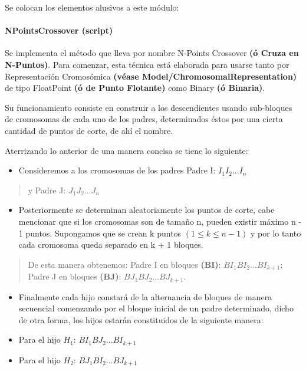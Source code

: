 \documentclass[letterpaper,10pt,english]{sphinxmanual}
\begin{document}
Se colocan los elementos alusivos a este módulo:


\paragraph{NPointsCrossover (script)}
\label{Model/Operator/Crossover/NPointsCrossover:npointscrossover-script}\label{Model/Operator/Crossover/NPointsCrossover::doc}
\begin{DUlineblock}{0em}
\item[] Se implementa el método que lleva por nombre N-Points Crossover \textbf{(ó Cruza en N-Puntos)}.
Para comenzar, esta técnica está elaborada para usarse tanto por Representación Cromosómica
\textbf{(véase Model/ChromosomalRepresentation)} de tipo FloatPoint \textbf{(ó de Punto Flotante)} como
Binary \textbf{(ó Binaria)}.
\item[] Su funcionamiento consiste en construir a los descendientes usando sub-bloques de cromosomas de cada
uno de los padres, determinados éstos por una cierta cantidad de puntos de corte, de ahí el nombre.
\item[] Aterrizando lo anterior de una manera concisa se tiene lo siguiente:
\end{DUlineblock}
\begin{itemize}
\item {} 
Consideremos a los cromosomas de los padres Padre I: \(I_1I_2...I_n\)

\end{itemize}
\begin{quote}

y Padre J: \(J_1J_2...J_n\)
\end{quote}
\begin{itemize}
\item {} 
Posteriormente se determinan aleatoriamente los puntos de corte, cabe mencionar que si los cromosomas son de tamaño n, pueden existir máximo n - 1 puntos. Supongamos que se crean k puntos \((1 \leqslant k \leqslant n - 1)\) y por lo tanto cada cromosoma queda separado en k + 1 bloques.

\end{itemize}
\begin{quote}

De esta manera obtenemos:
Padre I en bloques \textbf{(BI)}: \(BI_1BI_2...BI_{k + 1}\);
Padre J en bloques \textbf{(BJ)}: \(BJ_1BJ_2...BJ_{k + 1}\).
\end{quote}
\begin{itemize}
\item {} 
Finalmente cada hijo constará de la alternancia de bloques de manera secuencial comenzando por el bloque inicial de un padre determinado, dicho de otra forma, los hijos estarán constituidos de la siguiente manera:

\end{itemize}
\begin{itemize}
\item {} 
Para el hijo \(H_1\): \(BI_1BJ_2...BI_{k + 1}\)

\item {} 
Para el hijo \(H_2\): \(BJ_1BI_2...BJ_{k + 1}\)

\end{itemize}
\end{document}

